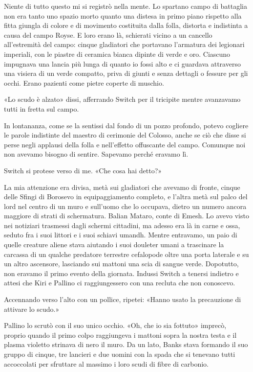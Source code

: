 Niente di tutto questo mi si registrò nella mente. Lo spartano campo di
battaglia non era tanto uno spazio morto quanto una distesa in primo
piano rispetto alla fitta giungla di colore e di movimento costituita
dalla folla, distorta e indistinta a causa del campo Royse. E loro erano
là, schierati vicino a un cancello all'estremità del campo: cinque
gladiatori che portavano l'armatura dei legionari imperiali, con le
piastre di ceramica bianca dipinte di verde e oro. Ciascuno impugnava
una lancia più lunga di quanto io fossi alto e ci guardava attraverso
una visiera di un verde compatto, priva di giunti e senza dettagli o
fessure per gli occhi. Erano pazienti come pietre coperte di muschio.

«Lo scudo è alzato» dissi, afferrando Switch per il tricipite mentre
avanzavamo tutti in fretta sul campo.

In lontananza, come se la sentissi dal fondo di un pozzo profondo,
potevo cogliere le parole indistinte del maestro di cerimonie del
Colosso, anche se ciò che disse si perse negli applausi della folla e
nell'effetto offuscante del campo. Comunque noi non avevamo bisogno di
sentire. Sapevamo perché eravamo lì.

Switch si protese verso di me. «Che cosa hai detto?»

La mia attenzione era divisa, metà sui gladiatori che avevamo di fronte,
cinque delle Sfingi di Borosevo in equipaggiamento completo, e l'altra
metà sul palco del lord nel centro di un muro e sull'uomo che lo
occupava, dietro un numero ancora maggiore di strati di schermatura.
Balian Mataro, conte di Emesh. Lo avevo visto nei notiziari trasmessi
dagli schermi cittadini, ma adesso era là in carne e ossa, seduto fra i
suoi littori e i suoi schiavi umandh. Mentre entravamo, un paio di
quelle creature aliene stava aiutando i suoi douleter umani a trascinare
la carcassa di un qualche predatore terrestre cefalopode oltre una porta
laterale e su un altro ascensore, lasciando sui mattoni una scia di
sangue verde. Dopotutto, non eravamo il primo evento della giornata.
Indussi Switch a tenersi indietro e attesi che Kiri e Pallino ci
raggiungessero con una recluta che non conoscevo.

Accennando verso l'alto con un pollice, ripetei: «Hanno usato la
precauzione di attivare lo scudo.»

Pallino lo scrutò con il suo unico occhio. «Oh, che io sia fottuto»
imprecò, proprio quando il primo colpo raggiungeva i mattoni sopra la
nostra testa e il plasma violetto strinava di nero il muro. Da un lato,
Banks stava formando il suo gruppo di cinque, tre lancieri e due uomini
con la spada che si tenevano tutti accoccolati per sfruttare al massimo
i loro scudi di fibre di carbonio.

